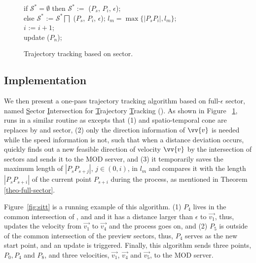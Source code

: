 \begin{figure}[tb!]
\begin{center}
{\begin{minipage}{3.3in}
{					\icc \>\hspace{3ex} if $\mathcal{S}^*=\emptyset$ then $\mathcal{S}^*:=$ ($P_s$, $P_{i}$, $\epsilon$); \\
					\icc \>\hspace{3ex} else $\mathcal{S}^*$ := $\mathcal{S}^*\bigsqcap$ ($P_s$, $P_{i}$, $\epsilon$); $l_{m} = \max\{|P_sP_{i}|, l_{m}\}$;\\
					\icc \>\hspace{3ex} $i$ := $i +1$;\\
					\icc \>\hspace{0ex} update ($P_{n}$); 
				}
				\vspace{-2ex}
				\myhrule
			\end{minipage}
		}
	\end{center}
	\vspace{-1ex}
	\caption{\small Trajectory tracking based on sector.}
	\label{alg:sitt}
	\vspace{-1ex}
\end{figure}

\subsection{Implementation}

We then present a one-pass trajectory tracking algorithm based on full-$\epsilon$ sector, named \underline{S}ector \underline{I}ntersection for \underline{T}rajectory \underline{T}racking (\sitt). As shown in Figure ~\ref{alg:sitt}, \sitt runs in a similar routine as \citt excepts that (1) \sed and spatio-temporal cone are replaces by \ped and sector, (2) only the direction information of $\vv{v}$ is needed while the speed information is not, such that when a distance deviation occurs, \sitt quickly finds out a new feasible direction of velocity $\vv{v}$ by the intersection of sectors and sends it to the MOD server, and (3) it temporarily saves the maximum length of $|P_sP_{s+j}|$, $j\in (0, i)$, in $l_m$ and compares it with the length $|P_sP_{s+i}|$ of the current point $P_{s+i}$ during the process, as mentioned in Theorem \ref{theo-full-sector}. 
%

\begin{example}
Figure~\ref{fig:sitt} is a running example of this algorithm. (1) $P_4$ lives in the common intersection of ,  and  and it has a \ped distance larger than $\epsilon$ to $\vec{v_1}$, thus, \sitt updates the velocity from $\vec{v_1}$ to $\vec{v_4}$ and the process goes on, and (2) $P_5$ is outside of the common intersection of the preview sectors, thus, $P_4$ serves as the new start point, and an update is triggered. Finally, this algorithm sends three points, $P_0, P_4$ and $P_8$, and three velocities, $\vec{v_1}$, $\vec{v_4}$ and $\vec{v_5}$, to the MOD server. 
\end{example}

